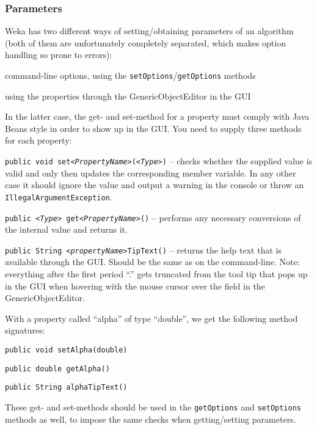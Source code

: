 \subsubsection*{Parameters}
Weka has two different ways of setting/obtaining parameters of an algorithm
(both of them are unfortunately completely separated, which makes option
handling so prone to errors):
\begin{tight_enumerate}
  \item command-line options, using the \texttt{setOptions}/\texttt{getOptions}
methods
  \item using the properties through the GenericObjectEditor in the GUI
\end{tight_enumerate}
In the latter case, the get- and set-method for a property must comply with 
Java Beans style in order to show up in the GUI. You need to supply three
methods for each property:
\begin{tight_itemize}
  \item \texttt{public void set\textit{<PropertyName>}(\textit{<Type>})} --
checks whether the supplied value is valid and only then updates the
corresponding member variable. In any other case it should ignore the value
and output a warning in the console or throw an
\texttt{IllegalArgumentException}.
  \item \texttt{public \textit{<Type>} get\textit{<PropertyName>}()} --
performs any necessary conversions of the internal value and returns it.
  \item \texttt{public String \textit{<propertyName>}TipText()} -- returns the
help text that is available through the GUI. Should be the same as on the
command-line. Note: everything after the first period ``.'' gets truncated from
the tool tip that pops up in the GUI when hovering with the mouse cursor over
the field in the GenericObjectEditor.
\end{tight_itemize}
With a property called ``alpha'' of type ``double'', we get the following
method signatures:
\begin{tight_itemize}
  \item \texttt{public void setAlpha(double)}
  \item \texttt{public double getAlpha()}
  \item \texttt{public String alphaTipText()}
\end{tight_itemize}
These get- and set-methods should be used in the \texttt{getOptions} and
\texttt{setOptions} methods as well, to impose the same checks when
getting/setting parameters.

